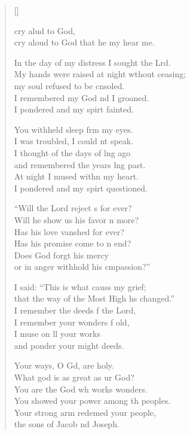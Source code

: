 \settowidth{\versewidth}{My hands were raised at night without ceasing; *}
\begin{verse}[\versewidth]
  \begin{patverse}
     cry alud to God,\Med\\
cry aloud to God that he my hear me.

In the day of my distress I sought the Lrd.\Flex\\
My hands were raised at night w\pointup{\i}thout ceasing;\Med\\
my soul refused to be cnsoled.\\
I remembered my God nd I groaned.\Med\\
I pondered and my spir\pointup{\i}t fainted.

You withheld sleep frm my eyes.\Med\\
I was troubled, I could nt speak.\\
I thought of the days of lng ago\Med\\
and remembered the years lng past.\\
At night I mused with\pointup{\i}n my heart.\Med\\
I pondered and my spir\pointup{\i}t questioned.

“Will the Lord reject s for ever?\Med\\
Will he show us his favor n more?\\
Has his love van\pointup{\i}shed for ever?\Med\\
Has his promise come to n end?\\
Does God forgt his mercy\Med\\
or in anger withhold his cmpassion?”

I said: “This is what causs my grief;\Med\\
that the way of the Most High hs changed.”\\
I remember the deeds f the Lord,\Med\\
I remember your wonders f old,\\
I muse on ll your works\Med\\
and ponder your might deeds.

Your ways, O Gd, are holy.\Med\\
What god is as great as ur God?\\
You are the God wh works wonders.\Med\\
You showed your power among th peoples.\\
Your strong arm redemed your people,\Med\\
the sons of Jacob nd Joseph.


\end{patverse}
\end{verse}
